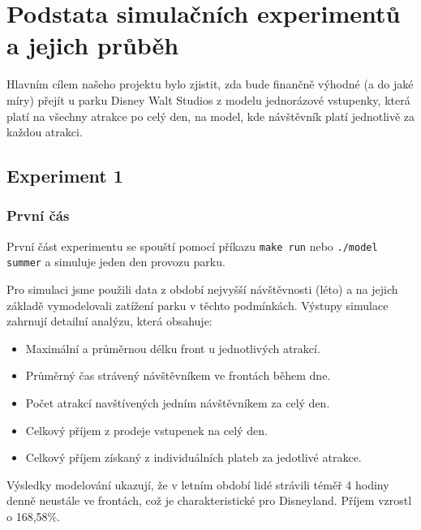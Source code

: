\documentclass[a4paper,12pt]{article}
\begin{document}
\section{Podstata simulačních experimentů a jejich průběh}

Hlavním cílem našeho projektu bylo zjistit, zda bude finančně výhodné (a do jaké míry) přejít u parku Disney Walt Studios z modelu jednorázové vstupenky, která platí na všechny atrakce po celý den, na model, kde návštěvník platí jednotlivě za každou atrakci.

\subsection{Experiment 1}

\subsubsection{První čás}
První část experimentu se spouští pomocí příkazu \texttt{make run} nebo \texttt{./model summer} a simuluje jeden den provozu parku.

Pro simulaci jsme použili data z období nejvyšší návštěvnosti (léto) a na jejich základě vymodelovali zatížení parku v těchto podmínkách. Výstupy simulace zahrnují detailní analýzu, která obsahuje:
\begin{itemize}
	\item Maximální a průměrnou délku front u jednotlivých atrakcí.
	\item Průměrný čas strávený návštěvníkem ve frontách během dne.
	\item Počet atrakcí navštívených jedním návštěvníkem za celý den.
	\item Celkový příjem z prodeje vstupenek na celý den.
	\item Celkový příjem získaný z individuálních plateb za jedotlivé atrakce.
\end{itemize}


Výsledky modelování ukazují, že v letním období lidé strávili téměř 4 hodiny denně neustále ve frontách, což je charakteristické pro Disneyland. Příjem vzrostl o 168,58\%.
\end{document}
